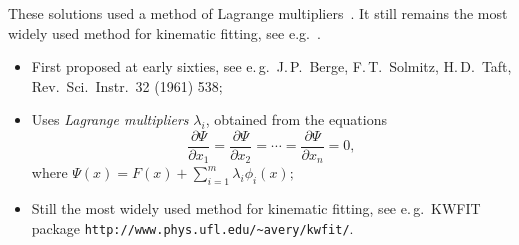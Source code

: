 These solutions used a method of Lagrange multipliers~\cite{b3}. It still remains the most widely used method for kinematic fitting, see e.g.~\cite{b4}.

\begin{itemize}
\item First proposed at early sixties, see e.\,g.\ J.\,P.~Berge, F.\,T.~Solmitz, H.\,D.~Taft, Rev.\ Sci.\ Instr.\ 32 (1961) 538;
\item Uses \emph{Lagrange multipliers} $\lambda_i$, obtained from the equations
\[\frac{\partial\Psi}{\partial x_1} = \frac{\partial\Psi}{\partial x_2} = \cdots = \frac{\partial\Psi}{\partial x_n} = 0,\]
where $\displaystyle\Psi(x) = F(x) + \sum_{i=1}^m\lambda_i\phi_i(x);$
\item Still the most widely used method for kinematic fitting, see e.\,g.\ KWFIT package \texttt{http://www.phys.ufl.edu/\textasciitilde{}avery/kwfit/}.
\end{itemize}
